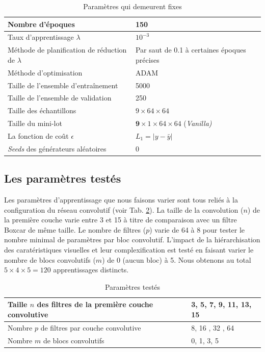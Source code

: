 \begin{table}[]
\begin{tabular}{|l|l|}
\hline
Nombre d'époques &  150 \\ 
\hline
Taux d'apprentissage $\lambda$ &  $10^{-3}$ \\ 
\hline
Méthode de planification de réduction de $\lambda$ & Par saut de 0.1 à certaines époques précises \\  
\hline
 Méthode d'optimisation &  ADAM \\ 
  \hline
 Taille de l'ensemble d'entraînement & 5000 \\ 
 \hline
  Taille de l'ensemble de validation & 250 \\ 
 \hline
 Taille des échantillons & $9 \times 64 \times 64$ \\ 
 \hline
 Taille du mini-lot &  $ \textbf{9} \times 1 \times 64 \times 64$ (\textit{Vanilla)} \\ 
\hline
 La fonction de coût $\epsilon$ &  $L_1 = |y - \bar{y}|$  \\ 
\hline
\textit{Seeds} des générateurs aléatoires & 0 \\
\hline
\end{tabular}
\caption{\small{Paramètres qui demeurent fixes}}
\label {tab:parametres_fixes}
\end{table}

\subsection{Les paramètres testés}

Les paramètres d'apprentissage que nous faisons varier sont tous reliés à la configuration du réseau convolutif (voir Tab. \ref{tab:parametres_test}).  La taille de la convolution ($n$) de la première couche varie entre 3 et 15 à titre de comparaison avec un filtre Boxcar de même taille. Le nombre de filtres ($p$) varie de 64 à 8 pour tester le nombre minimal de paramètres par bloc convolutif.  L'impact de la hiérarchisation des caratéristiques visuelles et leur complexification est testé en faisant varier le nombre de blocs convolutifs ($m$) de 0 (aucun bloc) à 5.  Nous obtenons au total $5 \times 4 \times 5 = 120$ apprentissages distincts.

\begin{table}[]
\begin{tabular}{|l|l|}
\hline
Taille $n$ des filtres de la première couche convolutive & 3, 5, 7, 9, 11, 13, 15\\ 
\hline
Nombre $p$ de filtres par couche convolutive &  8, 16 , 32 , 64 \\ 
\hline
Nombre $m$ de blocs convolutifs  & 0, 1, 3, 5\\  
\hline
\end{tabular}
\caption{\small{Paramètres testés}}
\label {tab:parametres_test}
\end{table}

